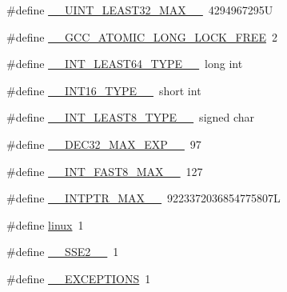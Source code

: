 \begin{DoxyCompactItemize}
\item 
\#define \hyperlink{build-analizer__host-_desktop___qt__5__9__0___g_c_c__64bit-debug_2moc__predefs_8h_a281ab632befbb2d5567ff114e2fa18f9}{\+\_\+\+\_\+\+U\+I\+N\+T\+\_\+\+L\+E\+A\+S\+T32\+\_\+\+M\+A\+X\+\_\+\+\_\+}~4294967295\+U
\item 
\#define \hyperlink{build-analizer__host-_desktop___qt__5__9__0___g_c_c__64bit-debug_2moc__predefs_8h_af6547beba0a34ed6bd6453f1220a97ca}{\+\_\+\+\_\+\+G\+C\+C\+\_\+\+A\+T\+O\+M\+I\+C\+\_\+\+L\+O\+N\+G\+\_\+\+L\+O\+C\+K\+\_\+\+F\+R\+E\+E}~2
\item 
\#define \hyperlink{build-analizer__host-_desktop___qt__5__9__0___g_c_c__64bit-debug_2moc__predefs_8h_aadf1477c4b8076c939fb4fdeca6f4b8e}{\+\_\+\+\_\+\+I\+N\+T\+\_\+\+L\+E\+A\+S\+T64\+\_\+\+T\+Y\+P\+E\+\_\+\+\_\+}~long int
\item 
\#define \hyperlink{build-analizer__host-_desktop___qt__5__9__0___g_c_c__64bit-debug_2moc__predefs_8h_a6770e92cfa87964cfcf358a6358f5347}{\+\_\+\+\_\+\+I\+N\+T16\+\_\+\+T\+Y\+P\+E\+\_\+\+\_\+}~short int
\item 
\#define \hyperlink{build-analizer__host-_desktop___qt__5__9__0___g_c_c__64bit-debug_2moc__predefs_8h_a1801bfbb7ab3b0ff09a48c3d78bd97e2}{\+\_\+\+\_\+\+I\+N\+T\+\_\+\+L\+E\+A\+S\+T8\+\_\+\+T\+Y\+P\+E\+\_\+\+\_\+}~signed char
\item 
\#define \hyperlink{build-analizer__host-_desktop___qt__5__9__0___g_c_c__64bit-debug_2moc__predefs_8h_aabb9dbf55546af708a50831a7c48d9b9}{\+\_\+\+\_\+\+D\+E\+C32\+\_\+\+M\+A\+X\+\_\+\+E\+X\+P\+\_\+\+\_\+}~97
\item 
\#define \hyperlink{build-analizer__host-_desktop___qt__5__9__0___g_c_c__64bit-debug_2moc__predefs_8h_ab11d0b7a18b7d57dff361c0848f28e09}{\+\_\+\+\_\+\+I\+N\+T\+\_\+\+F\+A\+S\+T8\+\_\+\+M\+A\+X\+\_\+\+\_\+}~127
\item 
\#define \hyperlink{build-analizer__host-_desktop___qt__5__9__0___g_c_c__64bit-debug_2moc__predefs_8h_ae19860f43757eb1fc151b38cb3bbc278}{\+\_\+\+\_\+\+I\+N\+T\+P\+T\+R\+\_\+\+M\+A\+X\+\_\+\+\_\+}~9223372036854775807\+L
\item 
\#define \hyperlink{build-analizer__host-_desktop___qt__5__9__0___g_c_c__64bit-debug_2moc__predefs_8h_aa092b0d4c1d4d4407b97024f6cb2820c}{linux}~1
\item 
\#define \hyperlink{build-analizer__host-_desktop___qt__5__9__0___g_c_c__64bit-debug_2moc__predefs_8h_a88cd3f961f8705563745c43024377efa}{\+\_\+\+\_\+\+S\+S\+E2\+\_\+\+\_\+}~1
\item 
\#define \hyperlink{build-analizer__host-_desktop___qt__5__9__0___g_c_c__64bit-debug_2moc__predefs_8h_a260281f3f3cd1c287fce0d5bb737febb}{\+\_\+\+\_\+\+E\+X\+C\+E\+P\+T\+I\+O\+N\+S}~1

\end{DoxyCompactItemize}
